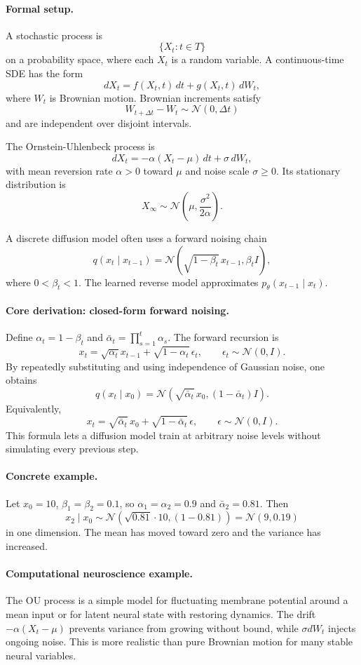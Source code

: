\paragraph{Formal setup.}
A stochastic process is
\[
\{X_t:t\in T\}
\]
on a probability space, where each \(X_t\) is a random variable. A continuous-time SDE has the form
\[
dX_t=f(X_t,t)\,dt+g(X_t,t)\,dW_t,
\]
where \(W_t\) is Brownian motion. Brownian increments satisfy
\[
W_{t+\Delta t}-W_t\sim\mathcal N(0,\Delta t)
\]
and are independent over disjoint intervals.

The Ornstein-Uhlenbeck process is
\[
dX_t=-\alpha(X_t-\mu)\,dt+\sigma\,dW_t,
\]
with mean reversion rate \(\alpha>0\) toward \(\mu\) and noise scale \(\sigma\geq0\). Its stationary distribution is
\[
X_\infty\sim \mathcal N\!\left(\mu,\frac{\sigma^2}{2\alpha}\right).
\]

A discrete diffusion model often uses a forward noising chain
\[
q(x_t\mid x_{t-1})=\mathcal N(\sqrt{1-\beta_t}\,x_{t-1},\beta_t I),
\]
where \(0<\beta_t<1\). The learned reverse model approximates \(p_\theta(x_{t-1}\mid x_t)\).

\paragraph{Core derivation: closed-form forward noising.}
Define \(\alpha_t=1-\beta_t\) and \(\bar\alpha_t=\prod_{s=1}^t\alpha_s\). The forward recursion is
\[
x_t=\sqrt{\alpha_t}x_{t-1}+\sqrt{1-\alpha_t}\,\epsilon_t,
\qquad \epsilon_t\sim\mathcal N(0,I).
\]
By repeatedly substituting and using independence of Gaussian noise, one obtains
\[
\boxed{
q(x_t\mid x_0)=
\mathcal N(\sqrt{\bar\alpha_t}\,x_0,(1-\bar\alpha_t)I).
}
\]
Equivalently,
\[
x_t=\sqrt{\bar\alpha_t}\,x_0+\sqrt{1-\bar\alpha_t}\,\epsilon,\qquad \epsilon\sim\mathcal N(0,I).
\]
This formula lets a diffusion model train at arbitrary noise levels without simulating every previous step.

\paragraph{Concrete example.}
Let \(x_0=10\), \(\beta_1=\beta_2=0.1\), so \(\alpha_1=\alpha_2=0.9\) and \(\bar\alpha_2=0.81\). Then
\[
x_2\mid x_0\sim\mathcal N(\sqrt{0.81}\cdot10,(1-0.81))
=\mathcal N(9,0.19)
\]
in one dimension. The mean has moved toward zero and the variance has increased.

\paragraph{Computational neuroscience example.}
The OU process is a simple model for fluctuating membrane potential around a mean input or for latent neural state with restoring dynamics. The drift \(-\alpha(X_t-\mu)\) prevents variance from growing without bound, while \(\sigma dW_t\) injects ongoing noise. This is more realistic than pure Brownian motion for many stable neural variables.


